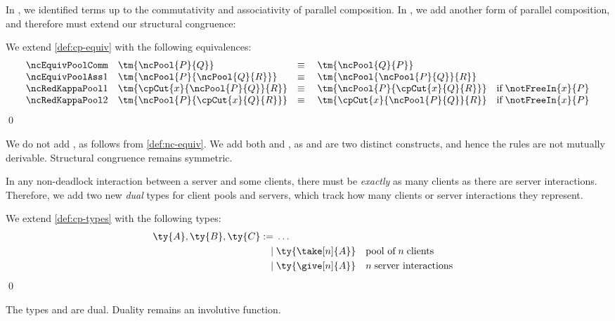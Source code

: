 \documentclass[UKenglish]{llncs}
\begin{document}
In \cp, we identified terms up to the commutativity and associativity of
parallel composition. In \nodcap, we add another form of parallel composition,
and therefore must extend our structural congruence:
\begin{definition}\label{def:nc-equiv}
  We extend \cref{def:cp-equiv} with the following equivalences:
  \[
    \begin{array}{llll}
      \ncEquivPoolComm
      & \tm{\ncPool{P}{Q}}
      & \equiv \;
      & \tm{\ncPool{Q}{P}}
      \\
      \ncEquivPoolAss1
      & \tm{\ncPool{P}{\ncPool{Q}{R}}}
      & \equiv \;
      & \tm{\ncPool{\ncPool{P}{Q}}{R}}
      \\
      \ncRedKappaPool1
      & \tm{\cpCut{x}{\ncPool{P}{Q}}{R}}
      & \equiv \;
      & \tm{\ncPool{P}{\cpCut{x}{Q}{R}}} \quad \text{if} \; \notFreeIn{x}{P} 
      \\
      \ncRedKappaPool2
      & \tm{\ncPool{P}{\cpCut{x}{Q}{R}}}
      & \equiv \;
      & \tm{\cpCut{x}{\ncPool{P}{Q}}{R}} \quad \text{if} \; \notFreeIn{x}{P}
    \end{array}
  \]
  \qed
\end{definition}
We do not add , as follows from \cref{def:nc-equiv}.
We add both  and , as  and
 are two distinct constructs, and hence the rules are not 
mutually derivable. Structural congruence remains symmetric.

In any non-deadlock interaction between a server and some clients, 
there must be \emph{exactly} as many clients as there are server interactions.
Therefore, we add two new \emph{dual} types for client pools and servers, which
track how many clients or server interactions they represent.
\begin{definition}[Types]\label{def:nc-types}
  We extend \cref{def:cp-types} with the following types:
  \[\!
    \begin{aligned}
      \ty{A}, \ty{B}, \ty{C}
           :=& \; \dots
      \\ \mid& \; \ty{\take[n]{A}} &&\text{pool of} \; n \; \text{clients}
      \\ \mid& \; \ty{\give[n]{A}} &&n \; \text{server interactions}
    \end{aligned}
  \]  
  \qed
\end{definition}
The types  and  are dual.
Duality remains an involutive function.
\end{document}
